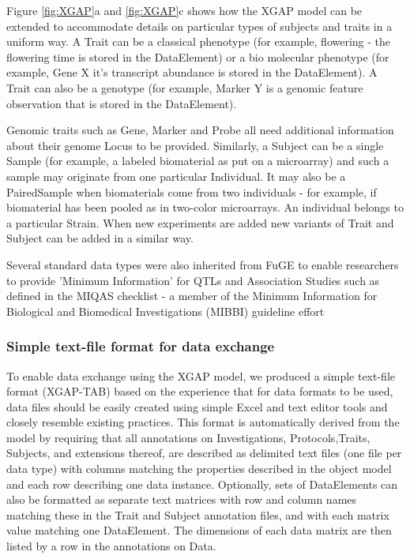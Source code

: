Figure \ref{fig:XGAP}a and \ref{fig:XGAP}c shows how the XGAP model can be extended to accommodate details on 
particular types of subjects and traits in a uniform way. A Trait can be a classical phenotype 
(for example, flowering - the flowering time is stored in the DataElement) or a bio molecular 
phenotype (for example, Gene X it's transcript abundance is stored in the DataElement). A 
Trait can also be a genotype (for example, Marker Y is a genomic feature observation that is 
stored in the DataElement). 

Genomic traits such as Gene, Marker and Probe all need additional information about their genome 
Locus to be provided. Similarly, a Subject can be a single Sample (for example, a labeled 
biomaterial as put on a microarray) and such a sample may originate from one particular Individual. 
It may also be a PairedSample when biomaterials come from two individuals - for example, if 
biomaterial has been pooled as in two-color microarrays. An individual belongs to a particular 
Strain. When new experiments are added new variants of Trait and Subject can be added in a similar 
way.

Several standard data types were also inherited from FuGE to enable researchers to provide 
'Minimum Information' for QTLs and Association Studies such as defined in the MIQAS checklist 
 - a member of the Minimum Information for Biological and Biomedical Investigations (MIBBI) 
guideline effort \cite{Taylor:2008}

\subsubsection{Simple text-file format for data exchange}
To enable data exchange using the XGAP model, we produced a simple text-file format (XGAP-TAB) based 
on the experience that for data formats to be used, data files should be easily created using simple 
Excel and text editor tools and closely resemble existing practices. This format is automatically 
derived from the model by requiring that all annotations on Investigations, Protocols,Traits, Subjects, 
and extensions thereof, are described as delimited text files (one file per data type) with columns 
matching the properties described in the object model and each row describing one data instance. 
Optionally, sets of DataElements can also be formatted as separate text matrices with row and column 
names matching these in the Trait and Subject annotation files, and with each matrix value matching 
one DataElement. The dimensions of each data matrix are then listed by a row in the annotations on Data.


